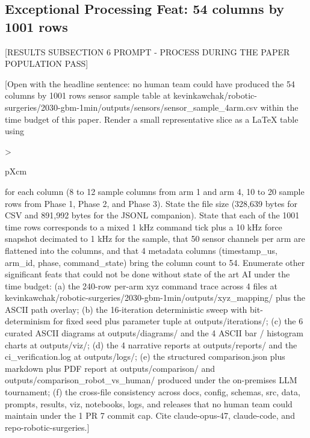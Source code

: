 \subsection{Exceptional Processing Feat: 54 columns by 1001 rows}
\label{sec:results-feat}

[RESULTS SUBSECTION 6 PROMPT - PROCESS DURING THE PAPER POPULATION PASS]

[Open with the headline sentence: no human team could have produced
the 54 columns by 1001 rows sensor sample table at
kevinkawchak/robotic-surgeries/2030-gbm-1min/outputs/sensors/sensor_sample_4arm.csv
within the time budget of this paper. Render a small representative
slice as a LaTeX table using {>{\raggedright\arraybackslash}p{Xcm}}
for each column (8 to 12 sample columns from arm 1 and arm 4, 10 to
20 sample rows from Phase 1, Phase 2, and Phase 3). State the file
size (328,639 bytes for CSV and 891,992 bytes for the JSONL
companion). State that each of the 1001 time rows corresponds to a
mixed 1 kHz command tick plus a 10 kHz force snapshot decimated to
1 kHz for the sample, that 50 sensor channels per arm are flattened
into the columns, and that 4 metadata columns (timestamp_us, arm_id,
phase, command_state) bring the column count to 54. Enumerate other
significant feats that could not be done without state of the art AI
under the time budget: (a) the 240-row per-arm xyz command trace
across 4 files at
kevinkawchak/robotic-surgeries/2030-gbm-1min/outputs/xyz_mapping/
plus the ASCII path overlay; (b) the 16-iteration deterministic
sweep with bit-determinism for fixed seed plus parameter tuple at
outputs/iterations/; (c) the 6 curated ASCII diagrams at
outputs/diagrams/ and the 4 ASCII bar / histogram charts at
outputs/viz/; (d) the 4 narrative reports at outputs/reports/ and
the ci_verification.log at outputs/logs/; (e) the structured
comparison.json plus markdown plus PDF report at
outputs/comparison/ and outputs/comparison_robot_vs_human/ produced
under the on-premises LLM tournament; (f) the cross-file consistency
across docs, config, schemas, src, data, prompts, results, viz,
notebooks, logs, and releases that no human team could maintain
under the 1 PR 7 commit cap. Cite claude-opus-47, claude-code, and
repo-robotic-surgeries.]
